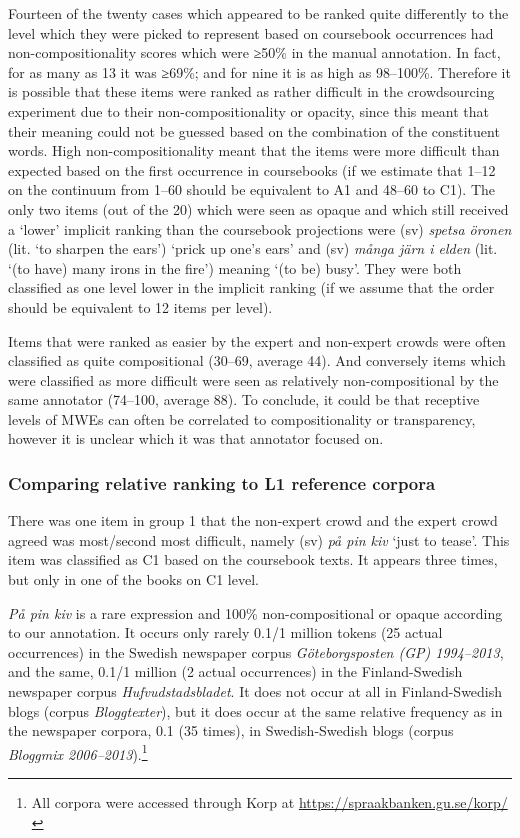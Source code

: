 \documentclass[output=paper,colorlinks,citecolor=brown]{langscibook}
\begin{document}
Fourteen of the twenty cases which appeared to be ranked quite differently to the level which they were picked to represent based on coursebook occurrences had non-compositionality scores which were ≥50\% in the manual annotation. In fact, for as many as 13 it was ≥69\%; and for nine it is as high as 98--100\%. Therefore it is possible that these items were ranked as rather difficult in the crowdsourcing experiment due to their non-compositionality or opacity, since this meant that their meaning could not be guessed based on the combination of the constituent words. High non-compositionality meant that the items were more difficult than expected based on the first occurrence in coursebooks (if we estimate that 1--12 on the continuum from 1--60 should be equivalent to A1 and 48–60 to C1). The only two items (out of the 20) which were seen as opaque and which still received a ‘lower’ implicit ranking than the coursebook projections were (sv) \textit{spetsa öronen}
(lit. `to sharpen the ears') `prick up one’s ears' and (sv) \textit{många järn i elden} 
(lit. `(to have) many irons in the fire') meaning `(to be) busy'. They were both classified as one level lower in the implicit ranking (if we assume that the order should be equivalent to 12 items per level).

Items that were ranked as easier by the expert and non-expert crowds were often classified as quite compositional 
(30–69, average 44). And conversely items which were classified as more difficult were seen as relatively non-compositional by the same annotator (74–100, average 88). To conclude, it could be that receptive levels of MWEs can often be correlated to compositionality or transparency, however it is unclear which it was that annotator focused on. 


\subsubsection{Comparing relative ranking to L1 reference corpora}\label{sec:MWErefcorpora}
There was one item in group 1 that the non-expert crowd and the expert crowd  
agreed was most/second most difficult, 
namely (sv) \textit{på pin kiv}  
`just to tease'. This item was classified as C1 based on the coursebook texts. It appears three times, but only in one of the books on C1 level.  

\textit{På pin kiv} is a rare expression and 100\% non-compositional or opaque according to our annotation. It occurs only rarely 0.1/1 million tokens (25 actual occurrences) in the Swedish newspaper corpus \textit{Göteborgsposten (GP) 1994–2013}, and the same, 0.1/1 million (2 actual occurrences) in the Finland-Swedish newspaper corpus \textit{Hufvudstadsbladet}. It does not occur at all in Finland-Swedish blogs (corpus \textit{Bloggtexter}), but it does occur at the same relative frequency as in the newspaper corpora, 0.1 (35 times), in Swedish-Swedish blogs (corpus \textit{Bloggmix 2006–2013}).\footnote{All corpora were accessed through Korp at \url{https://spraakbanken.gu.se/korp/}}
\end{document}
